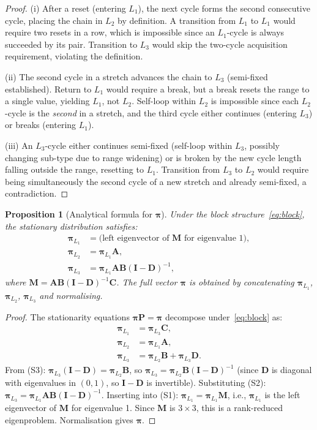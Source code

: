 \documentclass[12pt,a4paper]{article}
\newtheorem{proposition}{Proposition}
\newcommand{\piv}{\boldsymbol{\pi}}
\newcommand{\mat}[1]{\mathbf{#1}}
\begin{document}
\begin{proof}
(i) After a reset (entering $L_1$), the next cycle forms the second consecutive
cycle, placing the chain in $L_2$ by definition.  A transition from $L_1$ to
$L_1$ would require two resets in a row, which is impossible since an $L_1$-cycle
is always succeeded by its pair.  Transition to $L_3$ would skip the
two-cycle acquisition requirement, violating the definition.

(ii) The second cycle in a stretch advances the chain to $L_3$ (semi-fixed
established).  Return to $L_1$ would require a break, but a break resets the
range to a single value, yielding $L_1$, not $L_2$.  Self-loop within $L_2$
is impossible since each $L_2$-cycle is the \emph{second} in a stretch, and the
third cycle either continues (entering $L_3$) or breaks (entering $L_1$).

(iii) An $L_3$-cycle either continues semi-fixed (self-loop within $L_3$, possibly
changing sub-type due to range widening) or is broken by the new cycle length
falling outside the range, resetting to $L_1$.  Transition from $L_3$ to $L_2$
would require being simultaneously the second cycle of a new stretch and already
semi-fixed, a contradiction.
\end{proof}

\begin{proposition}[Analytical formula for $\piv$]\label{prop:formula}
Under the block structure~\eqref{eq:block}, the stationary distribution satisfies:
\begin{align}
  \piv_{L_1} &= \text{(left eigenvector of }\mat{M}\text{ for eigenvalue 1)},
              \label{eq:piL1}\\
  \piv_{L_2} &= \piv_{L_1}\mat{A},
              \label{eq:piL2}\\
  \piv_{L_3} &= \piv_{L_1}\mat{A}\mat{B}(\mat{I}-\mat{D})^{-1},
              \label{eq:piL3}
\end{align}
where $\mat{M} = \mat{A}\mat{B}(\mat{I}-\mat{D})^{-1}\mat{C}$.
The full vector $\piv$ is obtained by concatenating $\piv_{L_1}$, $\piv_{L_2}$,
$\piv_{L_3}$ and normalising.
\end{proposition}

\begin{proof}
The stationarity equations $\piv\mat{P} = \piv$ decompose under~\eqref{eq:block} as:
\begin{align*}
  \piv_{L_1} &= \piv_{L_3}\mat{C},                      \tag{S1}\\
  \piv_{L_2} &= \piv_{L_1}\mat{A},                      \tag{S2}\\
  \piv_{L_3} &= \piv_{L_2}\mat{B} + \piv_{L_3}\mat{D}.  \tag{S3}
\end{align*}
From (S3): $\piv_{L_3}(\mat{I}-\mat{D}) = \piv_{L_2}\mat{B}$, so
$\piv_{L_3} = \piv_{L_2}\mat{B}(\mat{I}-\mat{D})^{-1}$ (since $\mat{D}$ is
diagonal with eigenvalues in $(0,1)$, so $\mat{I}-\mat{D}$ is invertible).
Substituting (S2): $\piv_{L_3} = \piv_{L_1}\mat{A}\mat{B}(\mat{I}-\mat{D})^{-1}$.
Inserting into (S1): $\piv_{L_1} = \piv_{L_1}\mat{M}$, i.e., $\piv_{L_1}$ is
the left eigenvector of $\mat{M}$ for eigenvalue 1.  Since $\mat{M}$ is
$3\times3$, this is a rank-reduced eigenproblem.  Normalisation gives $\piv$.
\end{proof}
\end{document}
